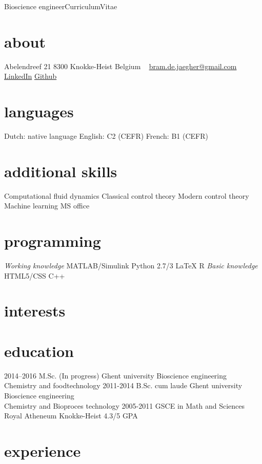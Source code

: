 \documentclass[]{friggeri-cv}
\begin{document}
       {Bioscience engineer}{Curriculum}{Vitae}
\begin{aside}
  \section{about}
    Abelendreef 21
    8300 Knokke-Heist
    Belgium
    ~
    \href{mailto:bram.de.jaegher@gmail.com}{bram.de.jaegher@gmail.com}
    \href{http://be.linkedin.com/in/BramDeJaegher}{LinkedIn}
    \href{https://github.com/Beramos}{Github}
  \section{languages}
    Dutch: native language
    English: C2 (CEFR)
    French:  B1  (CEFR)
  \section{additional skills}
  Computational fluid dynamics
  Classical control theory 
  Modern control theory 
  Machine learning
  MS office
  \section{programming}
  \textit{Working knowledge}
  MATLAB/Simulink
  Python 2.7/3
  LaTeX
  R 
  \textit{Basic knowledge}
  HTML5/CSS
  C++
\end{aside}
\section{interests}
\section{education}
\begin{entrylist}
    \entry
    {2014–2016}
    {M.Sc. (In progress)}
    {Ghent university}
    {Bioscience engineering\\
    Chemistry and foodtechnology}
  \entry
    {2011-2014}
    {B.Sc. cum laude}
    {Ghent university}
    {Bioscience engineering\\
    Chemistry and Bioproces technology}
  \entry
    {2005-2011}
    {GSCE in Math and Sciences}
    {Royal Atheneum Knokke-Heist}
    {4.3/5 GPA}
   
\end{entrylist}

\section{experience}
\end{document}
